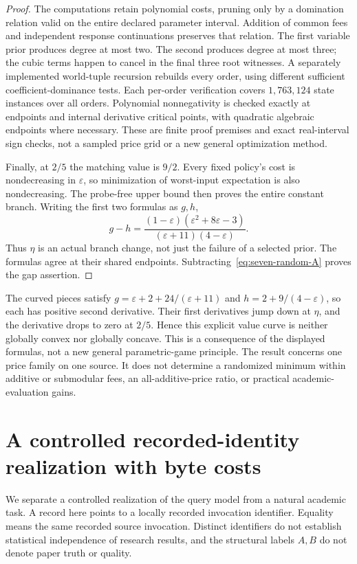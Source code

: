 \begin{proof}
The computations retain polynomial costs, pruning only by a domination relation valid on the entire declared parameter interval. Addition of common fees and independent response continuations preserves that relation. The first variable prior produces degree at most two. The second produces degree at most three; the cubic terms happen to cancel in the final three root witnesses. A separately implemented world-tuple recursion rebuilds every order, using different sufficient coefficient-dominance tests. Each per-order verification covers $1{,}763{,}124$ state instances over all orders. Polynomial nonnegativity is checked exactly at endpoints and internal derivative critical points, with quadratic algebraic endpoints where necessary. These are finite proof premises and exact real-interval sign checks, not a sampled price grid or a new general optimization method.

Finally, at $2/5$ the matching value is $9/2$. Every fixed policy's cost is nondecreasing in $\varepsilon$, so minimization of worst-input expectation is also nondecreasing. The probe-free upper bound then proves the entire constant branch. Writing the first two formulas as $g,h$,
\[
 g-h=\frac{(1-\varepsilon)(\varepsilon^2+8\varepsilon-3)}
                {(\varepsilon+11)(4-\varepsilon)}.
\]
Thus $\eta$ is an actual branch change, not just the failure of a selected prior. The formulas agree at their shared endpoints. Subtracting~\eqref{eq:seven-random-A} proves the gap assertion.
\end{proof}

The curved pieces satisfy $g=\varepsilon+2+24/(\varepsilon+11)$ and $h=2+9/(4-\varepsilon)$, so each has positive second derivative. Their first derivatives jump down at $\eta$, and the derivative drops to zero at $2/5$. Hence this explicit value curve is neither globally convex nor globally concave. This is a consequence of the displayed formulas, not a new general parametric-game principle. The result concerns one price family on one source. It does not determine a randomized minimum within additive or submodular fees, an all-additive-price ratio, or practical academic-evaluation gains.

\section{A controlled recorded-identity realization with byte costs}
\label{app:controlled-lineage-bytes}
We separate a controlled realization of the query model from a natural academic task. A record here points to a locally recorded invocation identifier. Equality means the same recorded source invocation. Distinct identifiers do not establish statistical independence of research results, and the structural labels $A,B$ do not denote paper truth or quality.

